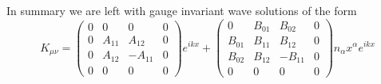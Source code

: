 \documentclass[10pt,letterpaper]{article}
\numberwithin{equation}{subsection}
\begin{document}
\\ \\
In summary we are left with gauge invariant wave solutions of the form
\begin{equation}
K_{\mu\nu} = \begin{pmatrix}0&0&0&0\\0&A_{11}&A_{12}&0\\0&A_{12}&-A_{11}&0\\0&0&0&0\end{pmatrix}e^{ikx} + \begin{pmatrix}
0&B_{01}&B_{02}&0\\B_{01}&B_{11}&B_{12}&0\\B_{02}&B_{12}&-B_{11}&0\\0&0&0&0  \end{pmatrix} n_\alpha x^\alpha e^{ikx}
\end{equation}
\end{document}
